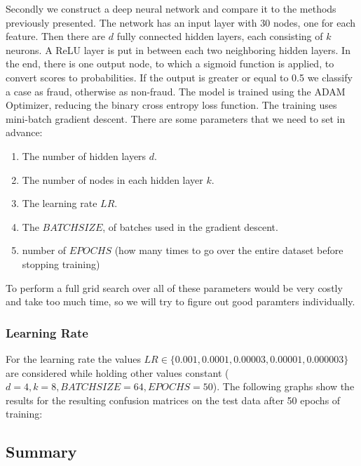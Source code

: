\documentclass[utf8x]{ctexart}
\begin{document}
Secondly we construct a deep neural network and compare it to the methods previously presented.
The network has an input layer with 30 nodes, one for each feature. Then there are $d$ fully connected hidden layers, each consisting of $k$ neurons. A ReLU layer is put in between each two neighboring hidden layers. In the end, there is one output node, to which a sigmoid function is applied, to convert scores to probabilities. If the output is greater or equal to 0.5 we classify a case as fraud, otherwise as non-fraud.
The model is trained using the ADAM Optimizer, reducing the binary cross entropy loss function. The training uses mini-batch gradient descent.
There are some parameters that we need to set in advance:
\begin{enumerate}
  \item The number of hidden layers $d$.
  \item The number of nodes in each hidden layer $k$.
  \item The learning rate $LR$.
  \item The $BATCH SIZE$, of batches used in the gradient descent.
  \item number of $EPOCHS$ (how many times to go over the entire dataset before stopping training)
\end{enumerate}
To perform a full grid search over all of these parameters would be very costly and take too much time, so we will try to figure out good paramters individually.

\subsubsection{Learning Rate}

For the learning rate the values $LR \in \{0.001, 0.0001, 0.00003,0.00001, 0.000003\}$are considered while holding other values constant ($d=4,k=8, BATCH SIZE=64, EPOCHS=50$).
The following graphs show the results  for the resulting confusion matrices on the test data after 50 epochs of training:




\subsection{Summary}

\newpage
{}
\renewcommand\refname{Bibliography}


\end{document}
